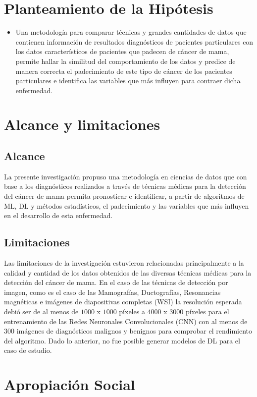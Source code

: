 \section{Planteamiento de la Hipótesis}
\begin{itemize}
	\item Una metodología para comparar técnicas y grandes cantidades de datos que contienen información de resultados diagnósticos de pacientes particulares con los datos característicos de pacientes que padecen de cáncer de mama, permite hallar la similitud del comportamiento de los datos y predice de manera correcta el padecimiento de este tipo de cáncer de los pacientes particulares e identifica las variables que más influyen para contraer dicha enfermedad. 
\end{itemize}

\newpage
\section{Alcance y limitaciones}
\subsection{Alcance}
La presente investigación propuso una metodología en ciencias de datos que con base a los diagnósticos realizados a través de técnicas médicas para la detección del cáncer de mama permita pronosticar e identificar, a partir de algoritmos de ML, DL y métodos estadísticos, el padecimiento y las variables que más influyen en el desarrollo de esta enfermedad.

\subsection{Limitaciones}
Las limitaciones de la investigación estuvieron relacionadas principalmente a la calidad y cantidad de los datos obtenidos de las diversas técnicas médicas para la detección del cáncer de mama. En el caso de las técnicas de detección por imagen, como es el caso de las Mamografías, Ductografías, Resonancias magnéticas e imágenes de diapositivas completas (WSI) la resolución esperada debió ser de al menos de $1000$ x $1000$ píxeles  a $4000$ x $3000$ píxeles para el entrenamiento de las Redes Neuronales Convolucionales (CNN) con al menos de 300 imágenes de diagnósticos malignos y benignos para comprobar el rendimiento del algoritmo. Dado lo anterior, no fue posible generar modelos de DL para el caso de estudio.

\section{Apropiación Social}

